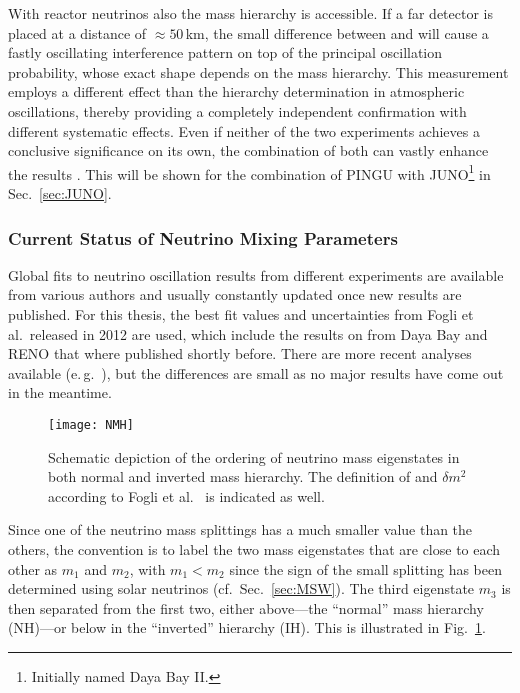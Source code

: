 With reactor neutrinos also the mass hierarchy is accessible. If a far detector
is placed at a distance of $\approx 50$\,km, the small difference between
 and  will cause a fastly oscillating interference pattern on top
of the principal oscillation probability, whose exact shape depends on the mass
hierarchy. This measurement employs a different effect than the hierarchy
determination in atmospheric oscillations, thereby providing a completely
independent confirmation with different systematic effects. Even if neither of
the two experiments achieves a conclusive significance on its own, the
combination of both can vastly enhance the results \cite{BlennowSchwetz}. This
will be shown for the combination of PINGU with JUNO\footnote{Initially
named Daya Bay II.} in Sec.~\ref{sec:JUNO}.

\subsubsection{Current Status of Neutrino Mixing Parameters}
\label{sec:MixingParams}

Global fits to neutrino oscillation results from different experiments are
available from various authors and usually constantly updated once new results
are published. For this thesis, the best fit values and uncertainties from Fogli
et al.\ released in 2012 \cite{Fogli2012} are used, which include the results
on  from Daya Bay and RENO that where published shortly before. There
are more recent analyses available (e.\,g.\ \cite{Capozzi2013,
GonzalezGarcia2014}), but the differences are small as no major results have
come out in the meantime.

\begin{figure}
 \centering
 \texttt{[image: NMH]}
 \caption{Schematic depiction of the ordering of neutrino mass eigenstates in
    both normal and inverted mass hierarchy. The definition of \dm{} and $\delta
    m^2$ according to Fogli et al.\ \cite{Fogli2012} is indicated as well.}
 \label{fig:NMH}
\end{figure} 
Since one of the neutrino mass splittings has a much smaller value than the
others, the convention is to label the two mass eigenstates that are close to
each other as $m_1$ and $m_2$, with $m_1 < m_2$ since the sign of the small
splitting has been determined using solar neutrinos (cf.\ Sec.~\ref{sec:MSW}).
The third eigenstate $m_3$ is then separated from the first two, either
above---the ``normal'' mass hierarchy (NH)---or below in the ``inverted''
hierarchy (IH). This is illustrated in Fig.~\ref{fig:NMH}.

